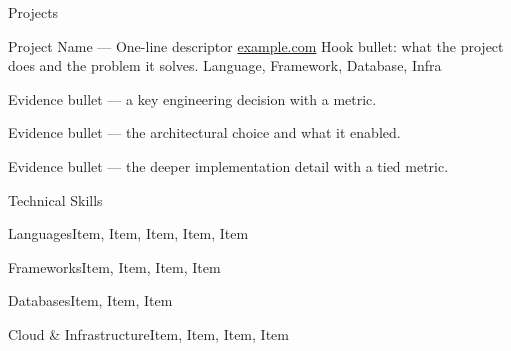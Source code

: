 \documentclass[
	11pt
]{template}
\begin{document}
	\begin{rSection}{P}{rojects}
		\begin{rSectionEntry}
			{Project Name --- One-line descriptor}
			{\href{https://example.com}{example.com}}
			{Hook bullet: what the project does and the problem it solves.}
			{Language, Framework, Database, Infra}
			{}

			\item {Evidence bullet — a key engineering decision with a metric.}
			\item {Evidence bullet — the architectural choice and what it enabled.}
			\item {Evidence bullet — the deeper implementation detail with a tied metric.}
		\end{rSectionEntry}

	\end{rSection}

	\begin{rSection}{T}{echnical Skills}
		\begin{rSet}{Languages}{Item, Item, Item, Item, Item}
		\end{rSet}
		\begin{rSet}{Frameworks}{Item, Item, Item, Item}
		\end{rSet}
		\begin{rSet}{Databases}{Item, Item, Item}
		\end{rSet}
		\begin{rSet}{Cloud \& Infrastructure}{Item, Item, Item, Item}
		\end{rSet}
	\end{rSection}
\end{document}
